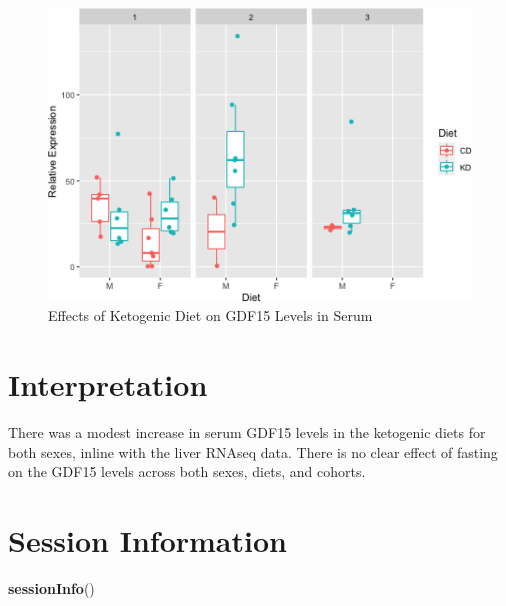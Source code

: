 \documentclass[]{article}
\newenvironment{Shaded}{\begin{snugshade}}{\end{snugshade}}
\newcommand{\KeywordTok}[1]{\textcolor[rgb]{0.13,0.29,0.53}{\textbf{#1}}}
\newcommand{\NormalTok}[1]{#1}
\begin{document}
\begin{figure}
\centering
\includegraphics{figures/kd-gdf15-boxplots-2.png}
\caption{Effects of Ketogenic Diet on GDF15 Levels in Serum}
\end{figure}

\hypertarget{interpretation}{%
\section{Interpretation}\label{interpretation}}

There was a modest increase in serum GDF15 levels in the ketogenic diets
for both sexes, inline with the liver RNAseq data. There is no clear
effect of fasting on the GDF15 levels across both sexes, diets, and
cohorts.

\hypertarget{session-information}{%
\section{Session Information}\label{session-information}}

\begin{Shaded}
\begin{Highlighting}[]
\KeywordTok{sessionInfo}\NormalTok{()}
\end{Highlighting}
\end{Shaded}
\end{document}

